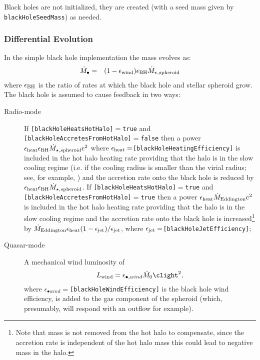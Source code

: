 Black holes are not initialized, they are created (with a seed mass given by {\tt blackHoleSeedMass}) as needed.

\subsubsection{Differential Evolution}

In the simple black hole implementation the mass evolves as:
\begin{eqnarray}
\dot{M}_\bullet &=& (1-\epsilon_{\rm wind}) \epsilon_{\rm BH} \dot{M}_{\star,s{\rm pheroid}} \\
\end{eqnarray}
where $\epsilon_{\rm BH}$ is the ratio of rates at which the black hole and stellar spheroid grow. The black hole is assumed to cause feedback in two ways:
\begin{description}
 \item [Radio-mode] If {\tt [blackHoleHeatsHotHalo]}$=${\tt true} and {\tt [blackHoleAccretesFromHotHalo]}$=${\tt false} then a power $\epsilon_{\rm heat} \epsilon_{\rm BH} \dot{M}_{\star,s{\rm pheroid}} {\rm c}^2$ where $\epsilon_{\rm heat}=${\tt [blackHoleHeatingEfficiency]} is included in the hot halo heating rate providing that the halo is in the slow cooling regime (i.e. if the cooling radius is smaller than the virial radius; see, for example, \citealt{benson_cold_2010}) and the accretion rate onto the black hole is reduced by $\epsilon_{\rm heat} \epsilon_{\rm BH} \dot{M}_{\star,s{\rm pheroid}}$. If {\tt [blackHoleHeatsHotHalo]}$=${\tt true} and {\tt [blackHoleAccretesFromHotHalo]}$=${\tt true} then a power $\epsilon_{\rm heat} \dot{M}_{\rm Eddington} {\rm c}^2$ is included in the hot halo heating rate providing that the halo is in the slow cooling regime and the accretion rate onto the black hole is increased\footnote{Note that mass is not removed from the hot halo to compensate, since the accretion rate is independent of the hot halo mass this could lead to negative mass in the halo.} by $\dot{M}_{\rm Eddington} \epsilon_{\rm heat} (1-\epsilon_{\rm jet})/\epsilon_{\rm jet}$, where $\epsilon_{\rm jet}=${\tt [blackHoleJetEfficiency]};
 \item [Quasar-mode] A mechanical wind luminosity of \citep{ostriker_momentum_2010}
\begin{equation}
 L_{\rm wind} = \epsilon_{\bullet, wind} \dot{M}_0 \clight^2,
\end{equation}
where $\epsilon_{\bullet wind}=${\tt [blackHoleWindEfficiency]} is the black hole wind efficiency, is added to the gas \gls{component} of the spheroid (which, presumably, will respond with an outflow for example).
\end{description}

